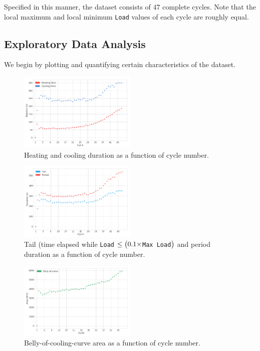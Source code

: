 \documentclass[letterpaper, 10 pt, conference]{ieeeconf}  %
\begin{document}
Specified in this manner, the dataset consists of $47$ complete cycles. Note that the local maximum and local minimum \verb|Load| values of each cycle are roughly equal.

\subsection{Exploratory Data Analysis}

We begin by plotting and quantifying certain characteristics of the dataset.

\label{heatingcooling}
\begin{figure}[h]
	\centering
  \includegraphics[width=0.5\textwidth]{assets/heatingcooling.png}
    \caption{Heating and cooling duration as a function of cycle number.}
\end{figure}

\label{tailperiod}
\begin{figure}[h]
	\centering
  \includegraphics[width=0.5\textwidth]{assets/tailperiod.png}
    \caption{Tail (time elapsed while \texttt{Load} $\leq \big{(} 0.1 \times $\texttt{Max Load}$\big{)}$ and period duration as a function of cycle number.}
\end{figure}

\label{belly}
\begin{figure}[h]
	\centering
  \includegraphics[width=0.5\textwidth]{assets/belly.png}
    \caption{Belly-of-cooling-curve area as a function of cycle number.}
\end{figure}
\end{document}
